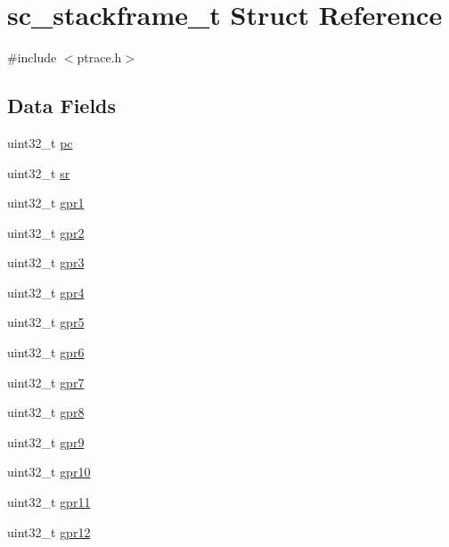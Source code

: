 \hypertarget{structsc__stackframe__t}{\section{sc\-\_\-stackframe\-\_\-t \-Struct \-Reference}
\label{structsc__stackframe__t}
}


{\ttfamily \#include $<$ptrace.\-h$>$}

\subsection*{\-Data \-Fields}
\begin{DoxyCompactItemize}
\item 
uint32\-\_\-t \hyperlink{structsc__stackframe__t_afaa20335217fae16f0e22b466017dae1}{pc}
\item 
uint32\-\_\-t \hyperlink{structsc__stackframe__t_ac6099d6faed5c217db5f616128468115}{sr}
\item 
uint32\-\_\-t \hyperlink{structsc__stackframe__t_abb3d84c2b03fcb29f18c31b633b1ff14}{gpr1}
\item 
uint32\-\_\-t \hyperlink{structsc__stackframe__t_a0a234a82199aaf5c6a453f414b2ca970}{gpr2}
\item 
uint32\-\_\-t \hyperlink{structsc__stackframe__t_ab0ed5ab2d20cc03e46a3c99057ecfa60}{gpr3}
\item 
uint32\-\_\-t \hyperlink{structsc__stackframe__t_ac0dc65f0341516876c8d584f00c28897}{gpr4}
\item 
uint32\-\_\-t \hyperlink{structsc__stackframe__t_a667bb9a3bad708595e27fd1b23b92ec5}{gpr5}
\item 
uint32\-\_\-t \hyperlink{structsc__stackframe__t_a0c3b975de7e32dbbf02824683a78a1b9}{gpr6}
\item 
uint32\-\_\-t \hyperlink{structsc__stackframe__t_a3acd73cab61418db4549669e9d976dae}{gpr7}
\item 
uint32\-\_\-t \hyperlink{structsc__stackframe__t_a85b77137179baee5d46ffeed85b44a0c}{gpr8}
\item 
uint32\-\_\-t \hyperlink{structsc__stackframe__t_a3803eca6937c4984b76bb28381a00182}{gpr9}
\item 
uint32\-\_\-t \hyperlink{structsc__stackframe__t_a877d54c16eb7008072aa5dd176d50e13}{gpr10}
\item 
uint32\-\_\-t \hyperlink{structsc__stackframe__t_a15db1af57060261b49f5a2f0a4316ec6}{gpr11}
\item 
uint32\-\_\-t \hyperlink{structsc__stackframe__t_a380b88552443d38818b64d9b58de469d}{gpr12}

\end{DoxyCompactItemize}
